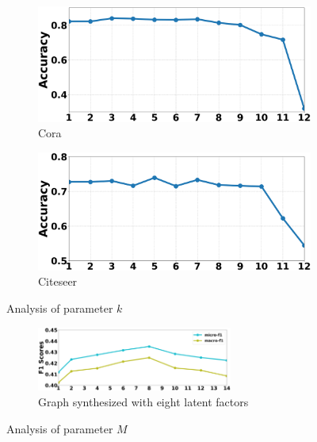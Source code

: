 \documentclass[accepted]{uai2021} %
\begin{document}
\begin{figure}[t]
     \centering
     \begin{subfigure}[b]{0.235\textwidth}
         \centering
         \includegraphics[width=1\columnwidth]{cora_ksensi_fig.png}
         \caption{\small{Cora}}
         \label{fig:ksensi_cora}
     \end{subfigure}
     \hfill
     \begin{subfigure}[b]{0.235\textwidth}
         \centering
         \includegraphics[width=1.0\columnwidth]{citeseer_ksensi_fig.png}
         \caption{\small{Citeseer}}
         \label{fig:ksensi_cite}
     \end{subfigure}
\caption{Analysis of parameter $k$}
\label{fig:KSensi}
\end{figure}
\begin{figure}[t]
    \captionsetup[subfigure]{labelformat=empty}
    \centering
    \begin{subfigure}[b]{1.0\columnwidth}
    \centering
    \includegraphics[width=0.705\textwidth]{fac8_channel_sensi.png}
    \caption{\small{Graph synthesized with eight latent factors}}
    \end{subfigure}
\caption{Analysis of parameter $M$}
\label{fig:channel_sensi}
\end{figure}
\end{document}

